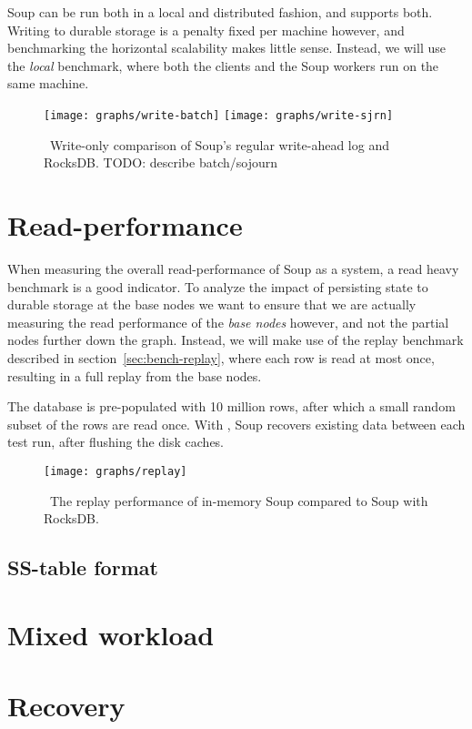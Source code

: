 Soup can be run both in a local and distributed fashion, and 
supports both. Writing to durable storage is a penalty fixed per machine
however, and benchmarking the horizontal scalability makes little sense.
Instead, we will use the \textit{local}  benchmark, where both the
clients and the Soup workers run on the same machine.

\begin{figure}[H]
  \centering
  \texttt{[image: graphs/write-batch]}
  \texttt{[image: graphs/write-sjrn]}
  \caption{\
    Write-only comparison of Soup's regular write-ahead log and RocksDB.\@
    TODO: describe batch/sojourn
  }\label{graph:write}
\end{figure}

\section{Read-performance}

When measuring the overall read-performance of Soup as a system, a read heavy
\code{vote} benchmark is a good indicator. To analyze the impact of persisting
state to durable storage at the base nodes we want to ensure that we are
actually measuring the read performance of the \textit{base nodes} however, and
not the partial nodes further down the graph. Instead, we will make use of the
replay benchmark described in section~\ref{sec:bench-replay}, where each row is
read at most once, resulting in a full replay from the base nodes.

The database is pre-populated with 10 million rows, after which a small random
subset of the rows are read once. With \code{PersistentState}, Soup recovers
existing data between each test run, after flushing the disk caches.

\begin{figure}[H]
  \centering
  \texttt{[image: graphs/replay]}
  \caption{\
    The replay performance of in-memory Soup compared to Soup with RocksDB.\@
  }\label{graph:replay}
\end{figure}

\subsection{SS-table format}

\section{Mixed workload}
\section{Recovery}
